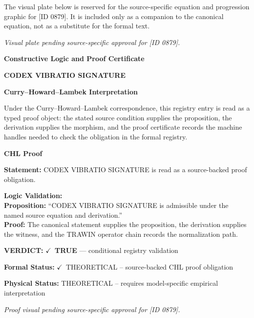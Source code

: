 \begingroup\footnotesize\sloppy
The visual plate below is reserved for the source-specific equation and progression graphic for [ID 0879]. It is included only as a companion to the canonical equation, not as a substitute for the formal text.
\par\endgroup
\begingroup\footnotesize\itshape
Visual plate pending source-specific approval for [ID 0879].
\par\endgroup

\clearpage
\begingroup\tzpsupportsetup
\noindent\textbf{\fontsize{10.8pt}{12.8pt}\selectfont [ID 0879] Constructive Logic and Proof Certificate}\par
\noindent\textbf{\fontsize{10pt}{12pt}\selectfont CODEX VIBRATIO SIGNATURE}\par
\vspace{0.45em}
\begingroup
\footnotesize
\setlength{\parskip}{0.22em}
\setlength{\parindent}{0pt}
\noindent\textbf{Curry--Howard--Lambek Interpretation}\par
Under the Curry--Howard--Lambek correspondence, this registry entry is read as a typed proof
object: the stated source condition supplies the proposition, the derivation supplies the
morphism, and the proof certificate records the machine handles needed to check the obligation
in the formal registry.

\vspace{0.45em}
\noindent\textbf{CHL Proof}\par
\textbf{Statement:} CODEX VIBRATIO SIGNATURE is read as a source-backed proof obligation.

\textbf{Logic Validation:}\\
\textbf{Proposition:} ``CODEX VIBRATIO SIGNATURE is admissible under the named source equation and derivation.''\\
\textbf{Proof:} The canonical statement supplies the proposition, the derivation supplies the witness, and the TRAWIN operator chain records the normalization path.

\textbf{VERDICT:} \ensuremath{\checkmark}\ \textbf{TRUE} --- conditional registry validation

\textbf{Formal Status:} \ensuremath{\checkmark}\ THEORETICAL -- source-backed CHL proof obligation

\textbf{Physical Status:} THEORETICAL -- requires model-specific empirical interpretation
\par\vspace{0.45em}
\par
\vfill
\begingroup\footnotesize\itshape
Proof visual pending source-specific approval for [ID 0879].
\par\endgroup
\vfill
\endgroup
\endgroup
